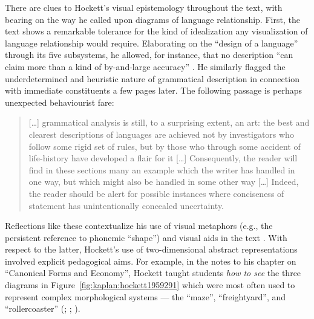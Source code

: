 \documentclass[output=paper]{langscibook}
\begin{document}
There are clues to Hockett's visual epistemology throughout the text, with bearing on the way he called upon diagrams of language relationship. First, the text shows a remarkable tolerance for the kind of idealization any visualization of language relationship would require. Elaborating on the ``design of a language'' through its five subsystems, he allowed, for instance, that no description ``can claim more than a kind of by-and-large accuracy'' \citep[139]{Hockett19591958}. He similarly flagged the underdetermined and heuristic nature of grammatical description in connection with immediate constituents a few pages later. The following passage is perhaps unexpected behaviourist fare:

\begin{quotation}
[…] grammatical analysis is still, to a surprising extent, an art: the best and clearest descriptions of languages are achieved not by investigators who follow some rigid set of rules, but by those who through some accident of life-history have developed a flair for it […] Consequently, the reader will find in these sections many an example which the writer has handled in one way, but which might also be handled in some other way […] Indeed, the reader should be alert for possible instances where conciseness of statement has unintentionally concealed uncertainty.  \citep[147]{Hockett19591958}
\end{quotation}

Reflections like these contextualize his use of visual metaphors (e.g., the persistent reference to phonemic ``shape'') and visual aids in the text \citep[130-132]{Hockett19591958}. With respect to the latter, Hockett's use of two-dimensional abstract representations involved explicit pedagogical aims. For example, in the notes to his chapter on ``Canonical Forms and Economy'', Hockett taught students \emph{how to see} the three diagrams in Figure~\ref{fig:kaplan:hockett1959291} which were most often used to represent complex morphological systems — the ``maze'', ``freightyard'', and ``rollercoaster'' (\citealt[290-292]{Hockett19591958}; \citealt{Harris1951}; \citealt{Hoenigswald1950}).
\end{document}
